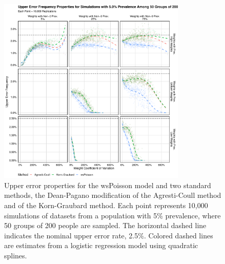 \begin{figure}
\centering
\includegraphics[width=0.8\textwidth]{perfect_upper_error_frequency_50_groups_0_05_prev}
\caption{Upper error properties for the wsPoisson model and two standard methods, the Dean-Pagano modification of the Agresti-Coull method and of the Korn-Graubard method.
Each point represents 10,000 simulations of datasets from a population with 5\% prevalence, where 50 groups of 200 people are sampled.
The horizontal dashed line indicates the nominal upper error rate, 2.5\%.
Colored dashed lines are estimates from a logistic regression model using quadratic splines.}
\label{ch_3:fig:perfect_upper_error_frequency_50_groups_0_05_prev}
\end{figure}

